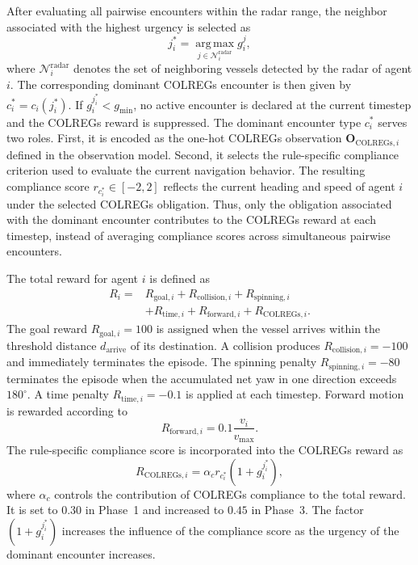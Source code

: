 \documentclass[final,5p,times,twocolumn]{elsarticle}
\begin{document}
{After evaluating all pairwise encounters within the radar range, the
neighbor associated with the highest urgency is selected as
\begin{equation}
j_i^*=\operatorname*{arg\,max}_{j\in\mathcal{N}_i^{\mathrm{radar}}}g_i^j,\label{eq:jstar}
\end{equation}
where $\mathcal{N}_i^{\mathrm{radar}}$ denotes the set of neighboring
vessels detected by the radar of agent $i$. The corresponding dominant
COLREGs encounter is then given by
$c_i^*=c_i(j_i^*)$.
If $g_i^{j_i^*}<g_{\mathrm{min}}$, no active encounter is declared at
the current timestep and the COLREGs reward is suppressed.
The dominant encounter type $c_i^*$ serves two roles. First, it is
encoded as the one-hot COLREGs observation
$\mathbf{O}_{\mathrm{COLREGs},i}$ defined in the observation model.
Second, it selects the rule-specific compliance criterion used to
evaluate the current navigation behavior. The resulting compliance score
$r_{c_i^*}\in[-2,2]$ reflects the current heading and speed of agent
$i$ under the selected COLREGs obligation. Thus, only the
obligation associated with the dominant encounter contributes to the
COLREGs reward at each timestep, instead of averaging compliance scores
across simultaneous pairwise encounters.

The total reward for agent $i$ is defined as
\begin{equation}
\begin{aligned}
R_i={}&R_{\mathrm{goal},i}
+R_{\mathrm{collision},i}
+R_{\mathrm{spinning},i}\\
&+R_{\mathrm{time},i}
+R_{\mathrm{forward},i}
+R_{\mathrm{COLREGs},i}.
\end{aligned}
\label{eq:total_reward}
\end{equation}
The goal reward $R_{\mathrm{goal},i}=100$ is assigned when the vessel
arrives within the threshold distance $d_{\mathrm{arrive}}$ of its
destination. A collision produces
$R_{\mathrm{collision},i}=-100$ and immediately terminates the episode.
The spinning penalty $R_{\mathrm{spinning},i}=-80$ terminates the
episode when the accumulated net yaw in one direction exceeds
$180^\circ$. A time penalty $R_{\mathrm{time},i}=-0.1$ is applied at
each timestep. Forward motion is rewarded according to
\begin{equation}
R_{\mathrm{forward},i}
=0.1
\frac{v_i}{v_{\mathrm{max}}}.
\end{equation}
The rule-specific compliance score is incorporated into the COLREGs
reward as
\begin{equation}
R_{\mathrm{COLREGs},i}=\alpha_c r_{c_i^*}(1+g_i^{j_i^*}),
\label{eq:rcolregs}
\end{equation}
where $\alpha_c$ controls the contribution of COLREGs compliance to the
total reward. It is set to $0.30$ in Phase~1 and increased to $0.45$
in Phase~3. The factor $(1+g_i^{j_i^*})$ increases the influence of
the compliance score as the urgency of the dominant encounter increases.

}
\end{document}
